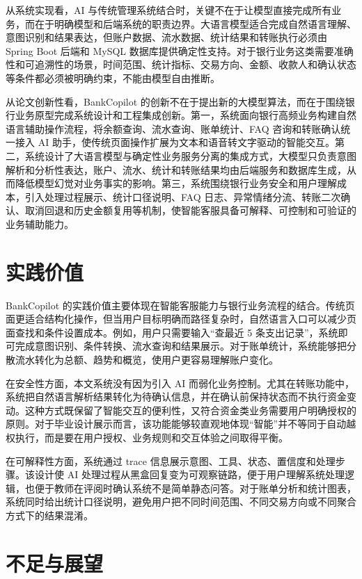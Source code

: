 \documentclass[bachelor, print]{xduthesis}
\begin{document}
从系统实现看，AI 与传统管理系统结合时，关键不在于让模型直接完成所有业务，而在于明确模型和后端系统的职责边界。大语言模型适合完成自然语言理解、意图识别和结果表达，但账户数据、流水数据、统计结果和转账执行必须由 Spring Boot 后端和 MySQL 数据库提供确定性支持。对于银行业务这类需要准确性和可追溯性的场景，时间范围、统计指标、交易方向、金额、收款人和确认状态等条件都必须被明确约束，不能由模型自由推断。

从论文创新性看，BankCopilot 的创新不在于提出新的大模型算法，而在于围绕银行业务原型完成系统设计和工程集成创新。第一，系统面向银行高频业务构建自然语言辅助操作流程，将余额查询、流水查询、账单统计、FAQ 咨询和转账确认统一接入 AI 助手，使传统页面操作扩展为文本和语音转文字驱动的智能交互。第二，系统设计了大语言模型与确定性业务服务分离的集成方式，大模型只负责意图解析和分析性表达，账户、流水、统计和转账结果均由后端服务和数据库生成，从而降低模型幻觉对业务事实的影响。第三，系统围绕银行业务安全和用户理解成本，引入处理过程展示、统计口径说明、FAQ 日志、异常情绪分流、转账二次确认、取消回退和历史金额复用等机制，使智能客服具备可解释、可控制和可验证的业务辅助能力。

\section{实践价值}

BankCopilot 的实践价值主要体现在智能客服能力与银行业务流程的结合。传统页面更适合结构化操作，但当用户目标明确而路径复杂时，自然语言入口可以减少页面查找和条件设置成本。例如，用户只需要输入“查最近 5 条支出记录”，系统即可完成意图识别、条件转换、流水查询和结果展示。对于账单统计，系统能够把分散流水转化为总额、趋势和概览，使用户更容易理解账户变化。

在安全性方面，本文系统没有因为引入 AI 而弱化业务控制。尤其在转账功能中，系统把自然语言解析结果转化为待确认信息，并在确认前保持状态而不执行资金变动。这种方式既保留了智能交互的便利性，又符合资金类业务需要用户明确授权的原则。对于毕业设计展示而言，该功能能够较直观地体现“智能”并不等同于自动越权执行，而是要在用户授权、业务规则和交互体验之间取得平衡。

在可解释性方面，系统通过 trace 信息展示意图、工具、状态、置信度和处理步骤。该设计使 AI 处理过程从黑盒回复变为可观察链路，便于用户理解系统处理逻辑，也便于教师在评阅时确认系统不是简单静态问答。对于账单分析和统计图表，系统同时给出统计口径说明，避免用户把不同时间范围、不同交易方向或不同聚合方式下的结果混淆。

\section{不足与展望}
\end{document}
